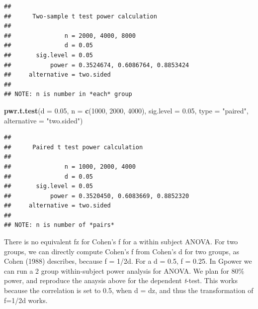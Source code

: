 \documentclass[]{book}
\newenvironment{Shaded}{\begin{snugshade}}{\end{snugshade}}
\newcommand{\DataTypeTok}[1]{\textcolor[rgb]{0.13,0.29,0.53}{#1}}
\newcommand{\DecValTok}[1]{\textcolor[rgb]{0.00,0.00,0.81}{#1}}
\newcommand{\FloatTok}[1]{\textcolor[rgb]{0.00,0.00,0.81}{#1}}
\newcommand{\KeywordTok}[1]{\textcolor[rgb]{0.13,0.29,0.53}{\textbf{#1}}}
\newcommand{\NormalTok}[1]{#1}
\newcommand{\StringTok}[1]{\textcolor[rgb]{0.31,0.60,0.02}{#1}}
\begin{document}
\begin{verbatim}
## 
##      Two-sample t test power calculation 
## 
##               n = 2000, 4000, 8000
##               d = 0.05
##       sig.level = 0.05
##           power = 0.3524674, 0.6086764, 0.8853424
##     alternative = two.sided
## 
## NOTE: n is number in *each* group
\end{verbatim}

\begin{Shaded}
\begin{Highlighting}[]
\KeywordTok{pwr.t.test}\NormalTok{(}\DataTypeTok{d =} \FloatTok{0.05}\NormalTok{,}
           \DataTypeTok{n =} \KeywordTok{c}\NormalTok{(}\DecValTok{1000}\NormalTok{, }\DecValTok{2000}\NormalTok{, }\DecValTok{4000}\NormalTok{),}
           \DataTypeTok{sig.level =} \FloatTok{0.05}\NormalTok{,}
           \DataTypeTok{type =} \StringTok{"paired"}\NormalTok{,}
           \DataTypeTok{alternative =} \StringTok{"two.sided"}\NormalTok{)}
\end{Highlighting}
\end{Shaded}

\begin{verbatim}
## 
##      Paired t test power calculation 
## 
##               n = 1000, 2000, 4000
##               d = 0.05
##       sig.level = 0.05
##           power = 0.3520450, 0.6083669, 0.8852320
##     alternative = two.sided
## 
## NOTE: n is number of *pairs*
\end{verbatim}

There is no equivalent fz for Cohen's f for a within subject ANOVA. For two groups, we can directly compute Cohen's f from Cohen's d for two groups, as Cohen (1988) describes, because f = 1/2d. For a d = 0.5, f = 0.25. In Gpower we can run a 2 group within-subject power analysis for ANOVA. We plan for 80\% power, and reproduce the anaysis above for the dependent \emph{t}-test. This works because the correlation is set to 0.5, when d = dz, and thus the transformation of f=1/2d works.
\end{document}
